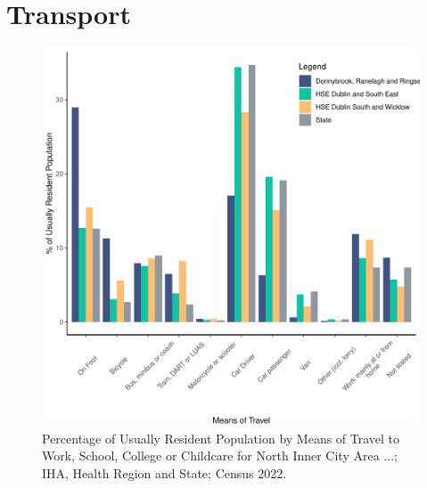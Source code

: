 \documentclass{article}
\begin{document}
\section{Transport}\label{sect:Trans}
\begin{figure}[H]
	\centering
	\includegraphics[width = 120mm]{../figures/TravelED.pdf}
	\caption{Percentage of Usually Resident Population by Means of Travel to Work, School, College or Childcare for North Inner City Area ...; IHA, Health Region and State; Census 2022.}
	\label{fig:vbnv}
	\end{figure}
\end{document}
